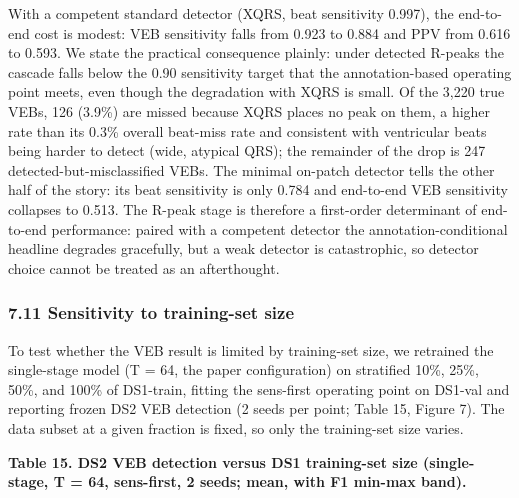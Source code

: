 \documentclass[
]{article}
\begin{document}
With a competent standard detector (XQRS, beat sensitivity 0.997), the
end-to-end cost is modest: VEB sensitivity falls from 0.923 to 0.884 and
PPV from 0.616 to 0.593. We state the practical consequence plainly:
under detected R-peaks the cascade falls below the 0.90 sensitivity
target that the annotation-based operating point meets, even though the
degradation with XQRS is small. Of the 3,220 true VEBs, 126 (3.9\%) are
missed because XQRS places no peak on them, a higher rate than its 0.3\%
overall beat-miss rate and consistent with ventricular beats being
harder to detect (wide, atypical QRS); the remainder of the drop is 247
detected-but-misclassified VEBs. The minimal on-patch detector tells the
other half of the story: its beat sensitivity is only 0.784 and
end-to-end VEB sensitivity collapses to 0.513. The R-peak stage is
therefore a first-order determinant of end-to-end performance: paired
with a competent detector the annotation-conditional headline degrades
gracefully, but a weak detector is catastrophic, so detector choice
cannot be treated as an afterthought.

\subsubsection{7.11 Sensitivity to training-set
size}\label{sensitivity-to-training-set-size}

To test whether the VEB result is limited by training-set size, we
retrained the single-stage model (T = 64, the paper configuration) on
stratified 10\%, 25\%, 50\%, and 100\% of DS1-train, fitting the
sens-first operating point on DS1-val and reporting frozen DS2 VEB
detection (2 seeds per point; Table 15, Figure 7). The data subset at a
given fraction is fixed, so only the training-set size varies.

\textbf{Table 15. DS2 VEB detection versus DS1 training-set size
(single-stage, T = 64, sens-first, 2 seeds; mean, with F1 min-max
band).}
\end{document}
